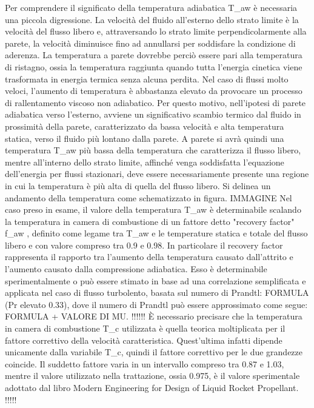 Per comprendere il significato della temperatura adiabatica T_{aw} è necessaria una piccola digressione. La velocità del fluido all'esterno dello strato limite è la velocità del flusso libero e, attraversando lo strato limite perpendicolarmente alla parete, la velocità diminuisce fino ad annullarsi per soddisfare la condizione di aderenza. La temperatura a parete dovrebbe perciò essere pari alla temperatura di ristagno, ossia la temperatura raggiunta quando tutta l'energia cinetica viene trasformata in energia termica senza alcuna perdita. Nel caso di flussi molto veloci, l'aumento di temperatura è abbastanza elevato da provocare un processo di rallentamento viscoso non adiabatico. Per questo motivo, nell'ipotesi di parete adiabatica verso l'esterno, avviene un significativo scambio termico dal fluido in prossimità della parete, caratterizzato da bassa velocità e alta temperatura statica, verso il fluido più lontano dalla parete. A parete si avrà quindi una temperatura T_{aw} più bassa della temperatura che caratterizza il flusso libero, mentre all'interno dello strato limite, affinché venga soddisfatta l'equazione dell'energia per flussi stazionari, deve essere necessariamente presente una regione in cui la temperatura è più alta di quella del flusso libero. Si delinea un andamento della temperatura come schematizzato in figura. IMMAGINE
Nel caso preso in esame, il valore della temperatura T_{aw} è determinabile scalando la temperatura in camera di combustione di un fattore detto "recovery factor" f_{aw} , definito come legame tra T_{aw} e le temperature statica e totale del flusso libero e con valore compreso tra 0.9 e 0.98. In particolare il recovery factor rappresenta il rapporto tra l'aumento della temperatura causato dall'attrito e l'aumento causato dalla compressione adiabatica. Esso è determinabile sperimentalmente o può essere stimato in base ad una correlazione semplificata e applicata nel caso di flusso turbolento, basata sul numero di Prandtl: FORMULA (Pr elevato 0.33), dove il numero di Prandtl può essere approssimato come segue: FORMULA + VALORE DI MU.
!!!!!! È necessario precisare che la temperatura in camera di combustione T_c utilizzata è quella teorica moltiplicata per il fattore correttivo della velocità caratteristica. Quest'ultima infatti dipende unicamente dalla variabile T_c, quindi il fattore correttivo per le due grandezze coincide. Il suddetto fattore varia in un intervallo compreso tra 0.87 e 1.03, mentre il valore utilizzato nella trattazione, ossia 0.975, è il valore sperimentale adottato dal libro Modern Engineering for Design of Liquid Rocket Propellant. !!!!!
